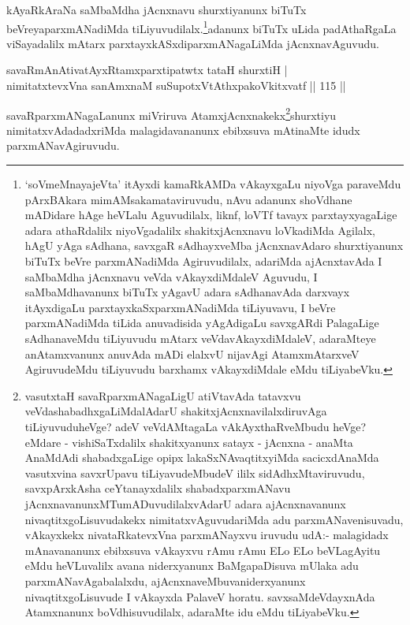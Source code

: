 \begin{artha}
kAyaRkAraNa saMbaMdha jAcnxnavu shurxtiyanunx biTuTx beVreyaparxmANadiMda tiLiyuvudilalx.\footnote{`soVmeMnayajeVta' itAyxdi kamaRkAMDa vAkayxgaLu niyoVga paraveMdu pArxBAkara mimAMsakamataviruvudu, nAvu adanunx shoVdhane mADidare hAge heVLalu Aguvudilalx, liknf, loVTf tavayx  parxtayxyagaLige adara athaRdalilx niyoVgadalilx shakitxjAcnxnavu loVkadiMda Agilalx, hAgU yAga sAdhana, savxgaR sAdhayxveMba jAcnxnavAdaro shurxtiyanunx biTuTx beVre parxmANadiMda Agiruvudilalx, adariMda ajAcnxtavAda I saMbaMdha jAcnxnavu veVda vAkayxdiMdaleV Aguvudu, I saMbaMdhavanunx biTuTx yAgavU adara sAdhanavAda darxvayx itAyxdigaLu parxtayxkaSxparxmANadiMda tiLiyuvavu, I beVre parxmANadiMda tiLida anuvadisida yAgAdigaLu savxgARdi PalagaLige sAdhanaveMdu tiLiyuvudu mAtarx veVdavAkayxdiMdaleV, adaraMteye anAtamxvanunx anuvAda mADi elalxvU nijavAgi AtamxmAtarxveV AgiruvudeMdu tiLiyuvudu barxhamx vAkayxdiMdale eMdu tiLiyabeVku.}adanunx biTuTx uLida padAthaRgaLa viSayadalilx mAtarx parxtayxkASxdiparxmANagaLiMda jAcnxnavAguvudu.
\end{artha}

\begin{shl}
savaRmAnAtivatAyxRtamxparxtipatwtx tataH shurxtiH |\\
nimitatxtevxVna sanAmxnaM suSupotxVtAthxpakoVkitxvatf \hfill || 115 ||
\end{shl}

\begin{artha}
savaRparxmANagaLanunx miVriruva AtamxjAcnxnakekx\footnote{vasutxtaH savaRparxmANagaLigU atiVtavAda tatavxvu veVdashabadhxgaLiMdalAdarU shakitxjAcnxnavilalxdiruvAga tiLiyuvuduheVge? adeV veVdAMtagaLa vAkAyxthaRveMbudu heVge? eMdare - vishiSaTxdalilx shakitxyanunx satayx - jAcnxna - anaMta AnaMdAdi shabadxgaLige opipx lakaSxNAvaqtitxyiMda sacicxdAnaMda vasutxvina savxrUpavu tiLiyavudeMbudeV ililx sidAdhxMtaviruvudu, savxpArxkAsha ceYtanayxdalilx shabadxparxmANavu jAcnxnavanunxMTumADuvudilalxvAdarU adara ajAcnxnavanunx nivaqtitxgoLisuvudakekx nimitatxvAguvudariMda adu parxmANavenisuvadu, vAkayxkekx nivataRkatevxVna parxmANayxvu iruvudu udA:- malagidadx mAnavananunx ebibxsuva vAkayxvu rAmu rAmu ELo ELo beVLagAyitu eMdu heVLuvalilx avana niderxyanunx BaMgapaDisuva mUlaka adu parxmANavAgabalalxdu, ajAcnxnaveMbuvaniderxyanunx nivaqtitxgoLisuvude I vAkayxda PalaveV horatu. savxsaMdeVdayxnAda Atamxnanunx boVdhisuvudilalx, adaraMte idu eMdu tiLiyabeVku.}shurxtiyu nimitatxvAdadadxriMda 
malagidavananunx ebibxsuva mAtinaMte idudx parxmANavAgiruvudu.
\end{artha}

